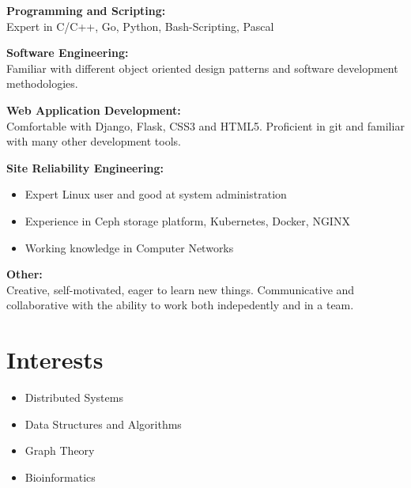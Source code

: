 \documentclass[margin]{res}
\begin{document}
\begin{resume}
	{\bf Programming and Scripting:}
	\\Expert in C/C++, Go, Python, Bash-Scripting, Pascal

    {\bf Software Engineering:}
    \\Familiar with different object oriented design patterns and software development methodologies.

	{\bf Web Application Development:}
	\\Comfortable with Django, Flask, CSS3 and HTML5. Proficient in git and familiar with many other development tools.

	{\bf Site Reliability Engineering:}
	\begin{itemize}
		\item Expert Linux user and good at system administration
		\item Experience in Ceph storage platform, Kubernetes, Docker, NGINX
		\item Working knowledge in Computer Networks
	\end{itemize}

	{\bf Other:}
	\\Creative, self-motivated, eager to learn new things. Communicative and collaborative with the ability to work both indepedently and in a team.

\section{Interests}
\begin{itemize}[leftmargin=0mm]
	\item Distributed Systems
	\item Data Structures and Algorithms
	\item Graph Theory
	\item Bioinformatics

\end{itemize}

\end{resume}
\end{document}
